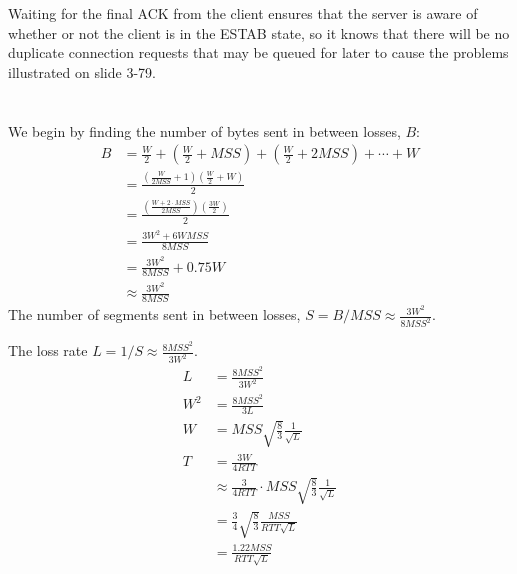 \documentclass[10pt,a4paper]{article}
\begin{document}
\section{}

Waiting for the final ACK from the client ensures that the server is aware of whether or not the client is in the ESTAB state, so it knows that there will be no duplicate connection requests that may be queued for later to cause the problems illustrated on slide 3-79.

\section{}
We begin by finding the number of bytes sent in between losses, $B$:
\begin{align*}
    B&=\frac{W}{2} + \left(\frac{W}{2} + MSS\right) + \left(\frac{W}{2} + 2MSS\right) + \cdots + W \\
     &=\frac{\left(\frac{W}{2MSS}+1\right)\left(\frac{W}{2}+W\right)}{2} \\
     &=\frac{\left(\frac{W+2\cdot MSS}{2MSS}\right)\left(\frac{3W}{2}\right)}{2} \\
     &=\frac{3W^2+6WMSS}{8MSS} \\
     &=\frac{3W^2}{8MSS} + 0.75 W \\
     &\approx \frac{3W^2}{8MSS}
\end{align*}
The number of segments sent in between losses, $S=B/MSS\approx\displaystyle\frac{3W^2}{8MSS^2}$.

The loss rate $L=1/S\approx\displaystyle\frac{8MSS^2}{3W^2}$.
\begin{align*}
    L&=\frac{8MSS^2}{3W^2} \\
    W^2&=\frac{8MSS^2}{3L} \\
    W&=MSS\sqrt{\frac{8}{3}}\frac{1}{\sqrt{L}} \\
    T&=\frac{3W}{4RTT} \\
    &\approx\frac{3}{4RTT}\cdot MSS\sqrt{\frac{8}{3}}\frac{1}{\sqrt{L}} \\
    &=\frac{3}{4}\sqrt{\frac{8}{3}}\frac{MSS}{RTT\sqrt{L}} \\
    &=\frac{1.22MSS}{RTT\sqrt{L}}
\end{align*}
\end{document}
